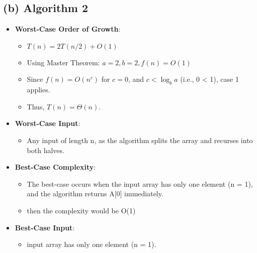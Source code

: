 \documentclass{article}
\begin{document}
\subsection*{(b) Algorithm 2}

\begin{itemize}
    \item \textbf{Worst-Case Order of Growth}:
    \begin{itemize}
        \item \( T(n) = 2T(n/2) + O(1) \)
        \item Using Master Theorem: \( a = 2, b = 2, f(n) = O(1) \)
        \item Since \( f(n) = O(n^c) \) for \( c = 0 \), and \( c < \log_b{a} \) (i.e., 0 < 1), case 1 applies.
        \item Thus, \( T(n) = \Theta(n) \).
    \end{itemize}
    
    \item \textbf{Worst-Case Input}:
    \begin{itemize}
        \item Any input of length n, as the algorithm splits the array and recurses into both halves.
    \end{itemize}

    \item \textbf{Best-Case Complexity}:
    \begin{itemize}
        \item The best-case occurs when the input array has only one element (n = 1), and the algorithm returns A[0] immediately.
        \item then the complexity would be  O(1)
    \end{itemize}

    \item \textbf{Best-Case Input}:
    \begin{itemize}
        \item  input array has only one element (n = 1).
    \end{itemize}
\end{itemize}
\end{document}

